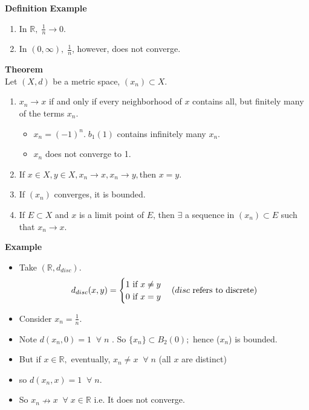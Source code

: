 \documentclass[12pt]{article}
\begin{document}
\begin{block}{\bf Definition}
\vspace{1\baselineskip}
\textbf{Example}
\begin{enumerate}[label=(\roman*)]
    \item In $\mathbb{R},\; \frac{1}{n} \rightarrow 0$.
    
    \item In $(0,\infty),\; \frac{1}{n}$, however, does not converge.
\end{enumerate}
 
\vspace{1\baselineskip}
\textbf{Theorem}\\
 Let $(X,d)$ be a metric space, $(x_n) \subset X.$
 \begin{enumerate}[label=(\roman*)]
     \item  $x_n \rightarrow x$ if and only if every neighborhood of $x$ contains all, but finitely many of the terms $x_n$.
     \begin{itemize}
         \item $x_n = (-1)^n.\;b_1(1)$ contains infinitely many $x_n$.
         \item $x_n$ does not converge to 1.
     \end{itemize}
     \item If $x\in X, y\in X, x_n \rightarrow x, x_n\rightarrow y, $then $x=y$.
     \item If $(x_n)$ converges, it is bounded.
     \item If $E \subset X$ and $x$ is a limit point of $E$, then $\exists$ a sequence in $(x_n) \subset E$ such that $x_n \rightarrow x$.
 \end{enumerate}
 
 \vspace{1\baselineskip}
 \textbf{Example}
 \begin{itemize}
     \item Take $(\mathbb{R}, d_{disc}).$
$$
 d_{disc}(x,y) =
 \begin{cases}
 1 \text{ if } x \neq y\\
 0 \text{ if } x = y
 \end{cases}
 \hfill (disc \text{ refers to discrete})$$
 
 \item Consider $x_n = \frac{1}{n}.$
 \item Note $d(x_n,0) = 1\;\; \forall\; n$ . So $\{{x_n}\} \subset B_2(0);$ hence ($x_n$) is bounded. 
 \item But if $x\in \mathbb{R}, $ eventually, $x_n \neq x\;\; \forall\; n$
 \hfill (all $x$ are distinct)
 \item so $d(x_n, x) = 1 \;\;\forall\;n.$ 
 \item So $x_n \nrightarrow x\;\;\forall\;x\in\mathbb{R}$\hfill
 i.e. It does not converge.
\end{itemize}
\end{block}
 
\end{document}
